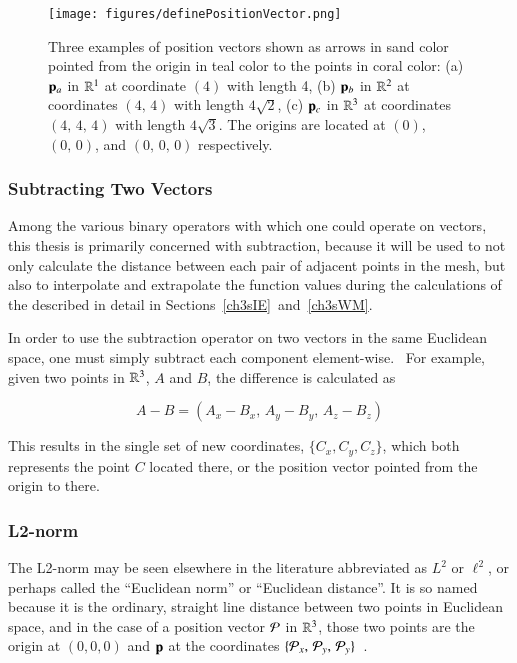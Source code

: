 \begin{figure}[ht]
\ffigbox
	{\texttt{[image: figures/definePositionVector.png]}}
	{\caption[Thre Examples of Position Vectors]{Three examples of position vectors shown as arrows in sand color pointed from the origin in teal color to the points in coral color: (a) $\mathbf{p}_a$ in $\mathbb{R}^{1}$ at coordinate $(4)$ with length 4, (b) $\mathbf{p}_b$ in $\mathbb{R}^{2}$ at coordinates $(4,\,4)$ with length $4\sqrt{2}$, (c) $\mathbf{p}_c$ in $\mathbb{R}^{3}$ at coordinates $(4,\,4,\,4)$ with length $4\sqrt{3}$. The origins are located at $(0)$, $(0,\,0)$, and $(0,\,0,\,0)$ respectively.}\label{fig:definePositionVector}}
\end{figure}

%
%
\subsubsection{Subtracting Two Vectors}
\label{ch2sETBssLAsssS2V}
Among the various binary operators with which one could operate on vectors, this thesis is primarily concerned with subtraction, because it will be used to not only calculate the distance between each pair of adjacent points in the mesh, but also to interpolate and extrapolate the function values during the calculations of the  described in detail in Sections~\ref{ch3sIE}~and~\ref{ch3sWM}.

In order to use the subtraction operator on two vectors in the same Euclidean space, one must simply subtract each component element-wise.~\cite{Weisstein19j} For example, given two points in $\mathbb{R}^{3}$, $A$ and $B$, the difference is calculated as

\begin{equation}
	A - B = (A_x - B_x,\,A_y - B_y,\,A_z - B_z)
	\label{eq:vectorSubtraction}
\end{equation}

This results in the single set of new coordinates, $\{C_x, C_y, C_z\}$, which both represents the point $C$ located there, or the position vector pointed from the origin to there.

%
%
\subsubsection{L2-norm}
\label{ch2sETBssLAsssL2N}
The L2-norm may be seen elsewhere in the literature abbreviated as $L^2$ or $\ell^2$, or perhaps called the ``Euclidean norm'' or ``Euclidean distance''. It is so named because it is the ordinary, straight line distance between two points in Euclidean space, and in the case of a position vector $\mathcal{P}$ in $\mathbb{R}^{3}$, those two points are the origin at $(0, 0, 0)$ and $\mathbf{p}$ at the coordinates $\{\mathcal{P}_x,\,\mathcal{P}_y,\,\mathcal{P}_y\}$~\cite{Weisstein19h}.

